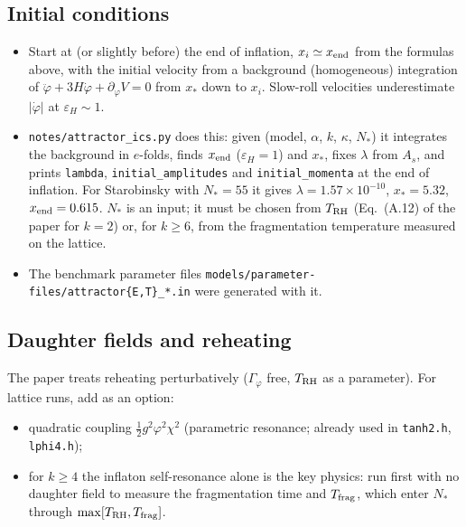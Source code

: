 \documentclass[11pt,a4paper]{article}
\newcommand{\trh}{T_{\rm RH}}
\newcommand{\aatt}{\alpha}
\begin{document}
\subsection{Initial conditions}
\begin{itemize}
\item Start at (or slightly before) the end of inflation, $x_i\simeq x_{\rm end}$ from the formulas above, with the initial velocity from a background (homogeneous) integration of $\ddot\varphi+3H\dot\varphi+\partial_\varphi V=0$ from $x_*$ down to $x_i$. Slow-roll velocities underestimate $|\dot\varphi|$ at $\varepsilon_H\sim1$.
\item \texttt{notes/attractor\_ics.py} does this: given (model, $\aatt$, $k$, $\kappa$, $N_*$) it integrates the background in $e$-folds, finds $x_{\rm end}$ ($\varepsilon_H=1$) and $x_*$, fixes $\lambda$ from $A_s$, and prints \texttt{lambda}, \texttt{initial\_amplitudes} and \texttt{initial\_momenta} at the end of inflation. For Starobinsky with $N_*=55$ it gives $\lambda=1.57\times10^{-10}$, $x_*=5.32$, $x_{\rm end}=0.615$. $N_*$ is an input; it must be chosen from $\trh$ (Eq.~(A.12) of the paper for $k=2$) or, for $k\ge6$, from the fragmentation temperature measured on the lattice.
\item The benchmark parameter files \texttt{models/parameter-files/attractor\{E,T\}\_*.in} were generated with it.
\end{itemize}

\subsection{Daughter fields and reheating}
The paper treats reheating perturbatively ($\Gamma_\varphi$ free, $\trh$ as a parameter). For lattice runs, add as an option:
\begin{itemize}
\item quadratic coupling $\tfrac12 g^2\varphi^2\chi^2$ (parametric resonance; already used in \texttt{tanh2.h}, \texttt{lphi4.h});
\item for $k\ge 4$ the inflaton self-resonance alone is the key physics: run first with no daughter field to measure the fragmentation time and $T_{\rm frag}$, which enter $N_*$ through $\max[\trh,T_{\rm frag}]$.
\end{itemize}
\end{document}

